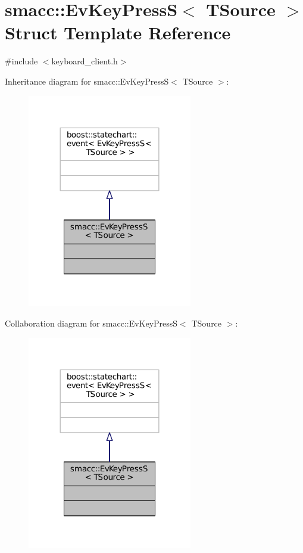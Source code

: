 \hypertarget{structsmacc_1_1EvKeyPressS}{}\section{smacc\+:\+:Ev\+Key\+PressS$<$ T\+Source $>$ Struct Template Reference}
\label{structsmacc_1_1EvKeyPressS}


{\ttfamily \#include $<$keyboard\+\_\+client.\+h$>$}



Inheritance diagram for smacc\+:\+:Ev\+Key\+PressS$<$ T\+Source $>$\+:
\nopagebreak
\begin{figure}[H]
\begin{center}
\leavevmode
\includegraphics[width=204pt]{structsmacc_1_1EvKeyPressS__inherit__graph}
\end{center}
\end{figure}


Collaboration diagram for smacc\+:\+:Ev\+Key\+PressS$<$ T\+Source $>$\+:
\nopagebreak
\begin{figure}[H]
\begin{center}
\leavevmode
\includegraphics[width=204pt]{structsmacc_1_1EvKeyPressS__coll__graph}
\end{center}
\end{figure}


